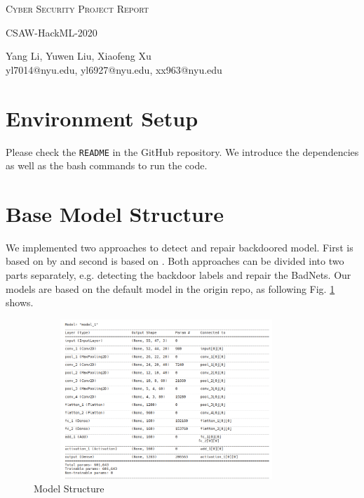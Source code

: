 \documentclass[letterpaper]{article}
\makeatletter
\newcommand{\soptitle}{Cyber Security Project Report}
\newcommand{\subtitle}{CSAW-HackML-2020}
\newcommand{\yourname}{Yang Li, Yuwen Liu, Xiaofeng Xu}
\newcommand{\youremail}{yl7014@nyu.edu, yl6927@nyu.edu, xx963@nyu.edu}
\newcommand{\amper}{{\fontspec[Scale=.95]{Adobe Caslon Pro}\selectfont\itshape\&~{}}}
\makeatother
\begin{document}
\begin{center}{\huge \scshape \soptitle}\end{center}
\begin{center}{\large \subtitle}\end{center}
\begin{center}\vspace{0.2em} {\Large \yourname\\}
  {\youremail}\end{center}

\section*{Environment Setup}
Please check the \texttt{README} in the GitHub repository\footnotemark{}. We introduce the dependencies as well as the bash commands to run the code.

\section*{Base Model Structure}
We implemented two approaches to detect and repair backdoored model. First is based on by \cite{wang2019neural} and second is based on \cite{gao2019strip}. Both approaches can be divided into two parts separately, e.g. detecting the backdoor labels and repair the BadNets. Our models are based on the default model in the origin repo, as following Fig. \ref{fig:base_structure} shows. 
\begin{figure}[H]
    \centering
    \includegraphics[width=10cm,  height=6cm]{img/model_structure.png}
    \caption{Model Structure}
    \label{fig:base_structure}
\end{figure}
\end{document}
